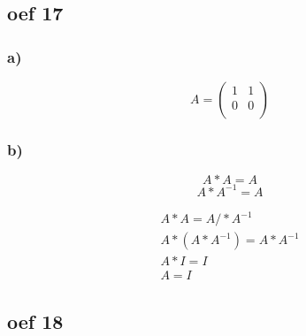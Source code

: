 \documentclass[10pt,a4paper]{article}
\begin{document}
\subsection*{oef 17}
\subsubsection*{a)}
\[
A= \left(\begin{array} {cc}
    1 & 1\\
    0 & 0\\
\end{array} \right)
\]

\subsubsection*{b)}
\[
A*A=A 
\]
\[
A*A^{-1}=A
\]

\begin{gather*}
A*A=A /*A^{-1}\\
A*(A*A^{-1})=A*A^{-1}\\
A*I=I\\
A=I
\end{gather*}

\subsection*{oef 18}
\end{document}
